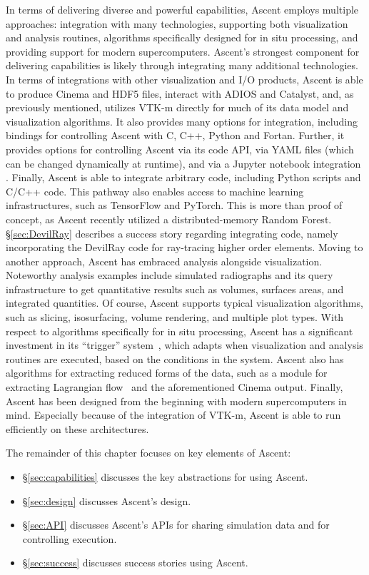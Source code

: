 In terms of delivering diverse and powerful capabilities, 
Ascent employs multiple approaches: 
integration with many technologies,
supporting both visualization and analysis routines,
algorithms specifically designed for in situ processing, 
and providing support for modern supercomputers.
%
Ascent's strongest component for delivering capabilities is likely
through integrating many additional technologies.
%
In terms of integrations with other visualization and I/O products,
Ascent is able to produce Cinema and HDF5 files, interact with
ADIOS and Catalyst, and, as previously mentioned, utilizes VTK-m
directly for much of its data model and visualization algorithms.
%
It also provides many options for integration, including 
bindings
for controlling Ascent with  C, C++, Python and Fortan.
%
Further, it provides options for controlling Ascent via its code API,
via YAML files (which can be changed dynamically at runtime), and via
a Jupyter notebook integration .
%
Finally, Ascent is able to integrate arbitrary code, including 
Python scripts and C/C++ code.
%
This pathway also enables access to 
machine learning infrastructures, such as TensorFlow and PyTorch.
%
This is more than proof of concept, 
as Ascent recently utilized a distributed-memory Random Forest.
%
\S\ref{sec:DevilRay} describes a success story regarding integrating 
code,
namely incorporating the DevilRay code for ray-tracing higher order
elements.
%
Moving to another approach, Ascent has embraced analysis alongside
visualization.
%
Noteworthy analysis examples include simulated radiographs and its
query infrastructure to get quantitative results such as volumes,
surfaces areas, and integrated quantities.
%
Of course, Ascent supports typical visualization algorithms, such as
slicing, isosurfacing, volume rendering, and multiple plot types.
%
With respect to algorithms specifically for in situ processing, Ascent
has a significant investment in its ``trigger'' system~\cite{Larsen:ISAV18},
which adapts when visualization and analysis routines are executed,
based on the conditions in the system.
%
Ascent also has algorithms for extracting reduced forms of the data,
such as a module for extracting Lagrangian flow~\cite{Agranovsky:LDAV2014,Sane:EGPGV19} and the
aforementioned Cinema output.
%
Finally, Ascent has been designed from the beginning with modern
supercomputers in mind.
%
Especially because of the integration of VTK-m, Ascent is able to
run efficiently on these architectures.

The remainder of this chapter focuses on key elements of Ascent:
\begin{itemize}
\item \S\ref{sec:capabilities} discusses the key abstractions for using Ascent.
\item \S\ref{sec:design} discusses Ascent's design.
\item \S\ref{sec:API} discusses Ascent's APIs for sharing simulation
data and for controlling execution.
\item \S\ref{sec:success} discusses success stories using Ascent. 
\end{itemize}

